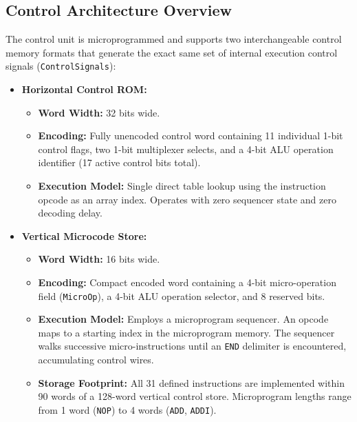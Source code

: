 \documentclass[11pt,a4paper]{article}
\begin{document}
\subsection{Control Architecture Overview}
The control unit is microprogrammed and supports two interchangeable control memory formats that generate the exact same set of internal execution control signals (\texttt{ControlSignals}):
\begin{itemize}
    \item \textbf{Horizontal Control ROM:}
    \begin{itemize}
        \item \textbf{Word Width:} 32 bits wide.
        \item \textbf{Encoding:} Fully unencoded control word containing 11 individual 1-bit control flags, two 1-bit multiplexer selects, and a 4-bit ALU operation identifier (17 active control bits total).
        \item \textbf{Execution Model:} Single direct table lookup using the instruction opcode as an array index. Operates with zero sequencer state and zero decoding delay.
    \end{itemize}
    \item \textbf{Vertical Microcode Store:}
    \begin{itemize}
        \item \textbf{Word Width:} 16 bits wide.
        \item \textbf{Encoding:} Compact encoded word containing a 4-bit micro-operation field (\texttt{MicroOp}), a 4-bit ALU operation selector, and 8 reserved bits.
        \item \textbf{Execution Model:} Employs a microprogram sequencer. An opcode maps to a starting index in the microprogram memory. The sequencer walks successive micro-instructions until an \texttt{END} delimiter is encountered, accumulating control wires.
        \item \textbf{Storage Footprint:} All 31 defined instructions are implemented within 90 words of a 128-word vertical control store. Microprogram lengths range from 1 word (\texttt{NOP}) to 4 words (\texttt{ADD}, \texttt{ADDI}).
    \end{itemize}
\end{itemize}
\end{document}
